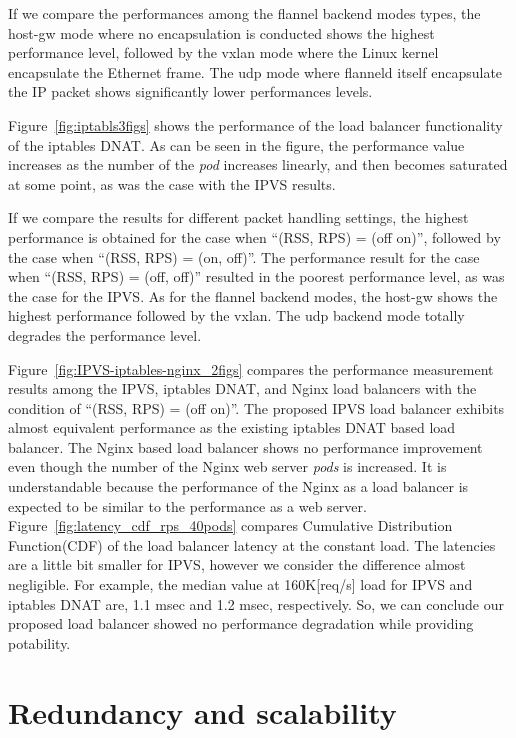 If we compare the performances among the flannel backend modes types, 
the host-gw mode where no encapsulation is conducted shows the highest performance level,
followed by the vxlan mode where the Linux kernel encapsulate the Ethernet frame.
The udp mode where flanneld itself encapsulate the IP packet shows significantly lower performances levels.

Figure~\ref{fig:iptabls3figs} shows the performance of the load balancer 
functionality of the iptables DNAT. 
As can be seen in the figure, the performance value increases as the number of the {\em pod} increases linearly, 
and then becomes saturated at some point, as was the case with the IPVS results.

If we compare the results for different packet handling settings, the highest performance is 
obtained for the case when \enquote{(RSS, RPS) = (off on)}, followed by the case when \enquote{(RSS, RPS) = (on, off)}. 
The performance result for the case when \enquote{(RSS, RPS) = (off, off)} resulted in the 
poorest performance level, as was the case for the IPVS.
As for the flannel backend modes, the host-gw shows the highest performance followed 
by the vxlan. The udp backend mode totally degrades the performance level.

Figure~\ref{fig:IPVS-iptables-nginx_2figs} compares the performance measurement results 
among the IPVS, iptables DNAT, and Nginx load balancers
with the condition of \enquote{(RSS, RPS) = (off on)}.
The proposed IPVS load balancer exhibits almost equivalent performance as the existing iptables DNAT based load balancer. 
The Nginx based load balancer shows no performance improvement even though the number of the Nginx web server {\em pods} is increased.
It is understandable because the performance of the Nginx as a load balancer is expected to be similar to the performance as a web server.
Figure~\ref{fig:latency_cdf_rps_40pods} compares Cumulative Distribution Function(CDF) of the load balancer latency at the constant load.
The latencies are a little bit smaller for IPVS, however we consider the difference almost negligible.
For example, the median value at 160K[req/s] load for IPVS and iptables DNAT are, 1.1 msec and 1.2 msec, respectively.
So, we can conclude our proposed load balancer showed no performance degradation while providing potability.

\section{Redundancy and scalability}

